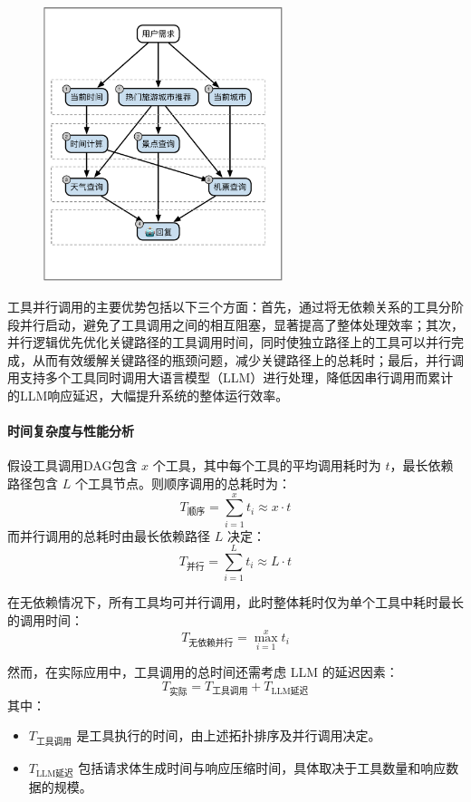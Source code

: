 \begin{figure}[!htp]
  \centering
  \setlength{\abovecaptionskip}{10pt}
  \includegraphics[height=8cm]{../assets/ch4-并行调用模块.pdf}
  \label{fig:parallel-invocation-logic}
\end{figure}

工具并行调用的主要优势包括以下三个方面：首先，通过将无依赖关系的工具分阶段并行启动，避免了工具调用之间的相互阻塞，显著提高了整体处理效率；其次，并行逻辑优先优化关键路径的工具调用时间，同时使独立路径上的工具可以并行完成，从而有效缓解关键路径的瓶颈问题，减少关键路径上的总耗时；最后，并行调用支持多个工具同时调用大语言模型（LLM）进行处理，降低因串行调用而累计的LLM响应延迟，大幅提升系统的整体运行效率。

\paragraph{时间复杂度与性能分析}

假设工具调用DAG包含 \(x\) 个工具，其中每个工具的平均调用耗时为 \(t\)，最长依赖路径包含 \(L\) 个工具节点。则顺序调用的总耗时为：
\[
T_{\text{顺序}} = \sum_{i=1}^{x} t_i \approx x \cdot t
\]
而并行调用的总耗时由最长依赖路径 \(L\) 决定：
\[
T_{\text{并行}} = \sum_{i=1}^{L} t_i \approx L \cdot t
\]

在无依赖情况下，所有工具均可并行调用，此时整体耗时仅为单个工具中耗时最长的调用时间：
\[
T_{\text{无依赖并行}} = \max_{i=1}^{x} t_i
\]

然而，在实际应用中，工具调用的总时间还需考虑 LLM 的延迟因素：
\[
T_{\text{实际}} = T_{\text{工具调用}} + T_{\text{LLM延迟}}
\]
其中：
\begin{itemize}
    \item \(T_{\text{工具调用}}\) 是工具执行的时间，由上述拓扑排序及并行调用决定。
    \item \(T_{\text{LLM延迟}}\) 包括请求体生成时间与响应压缩时间，具体取决于工具数量和响应数据的规模。
\end{itemize}

